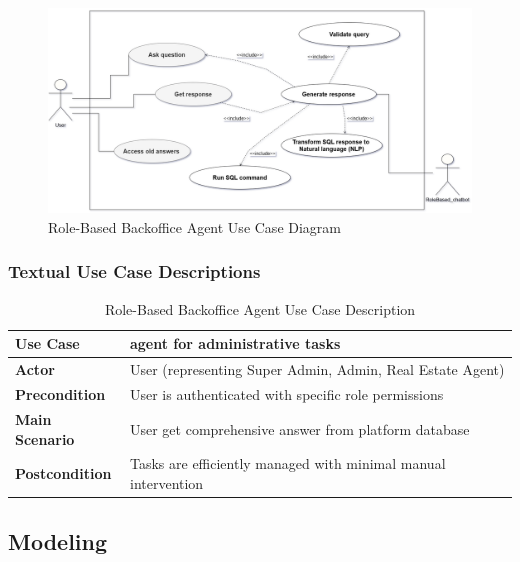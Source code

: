 \begin{figure}[htbp]
    \centering
    \includegraphics[width=1\textwidth]{images/backoffice_use_case_diagram.png}
    \caption{Role-Based Backoffice Agent Use Case Diagram}
    \label{fig:backoffice-use-case}
\end{figure}

\subsubsection{Textual Use Case Descriptions}

\begin{table}[htbp]
    \centering
    \begin{tabular}{|p{3cm}|p{10cm}|}
        \hline
        \textbf{Use Case} & \textbf{agent for administrative tasks} \\
        \hline
        \textbf{Actor} & User (representing Super Admin, Admin, Real Estate Agent) \\
        \hline
        \textbf{Precondition} & User is authenticated with specific role permissions \\
        \hline
        \textbf{Main Scenario} & User get comprehensive answer from platform database \\
        \hline
        \textbf{Postcondition} & Tasks are efficiently managed with minimal manual intervention \\
        \hline
    \end{tabular}
    \caption{Role-Based Backoffice Agent Use Case Description}
    \label{tab:backoffice-use-case}
\end{table}
\newpage

\subsection{Modeling}
